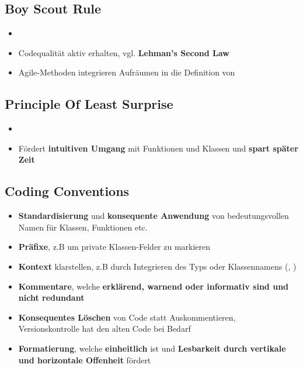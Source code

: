 \subsection{Boy Scout Rule}
\label{cc:sub:boy_scout_rule}

\begin{itemize}
	\item {}
	\item Codequalität aktiv erhalten, vgl. \textbf{Lehman's Second Law}
	\item Agile-Methoden integrieren Aufräumen in die Definition von 
\end{itemize}

\subsection{Principle Of Least Surprise}
\label{cc:sub:principle_of_least_surprise}

\begin{itemize}
	\item {}
	\item Fördert \textbf{intuitiven Umgang} mit Funktionen und Klassen und \textbf{spart später Zeit}
\end{itemize}

\subsection{Coding Conventions}
\label{cc:sub:coding_conventions}

\begin{itemize}
	\item \textbf{Standardisierung} und \textbf{konsequente Anwendung} von bedeutungsvollen Namen für Klassen, Funktionen etc.
	\item \textbf{Präfixe}, z.B um private Klassen-Felder zu markieren
	\item \textbf{Kontext} klarstellen, z.B durch Integrieren des Typs oder Klassennamens (, )
	\item \textbf{Kommentare}, welche \textbf{erklärend, warnend oder informativ sind und nicht redundant}
	\item \textbf{Konsequentes Löschen} von Code statt Auskommentieren, Versionskontrolle hat den alten Code bei Bedarf
	\item \textbf{Formatierung}, welche \textbf{einheitlich} ist und \textbf{Lesbarkeit durch vertikale und horizontale Offenheit} fördert
\end{itemize}

